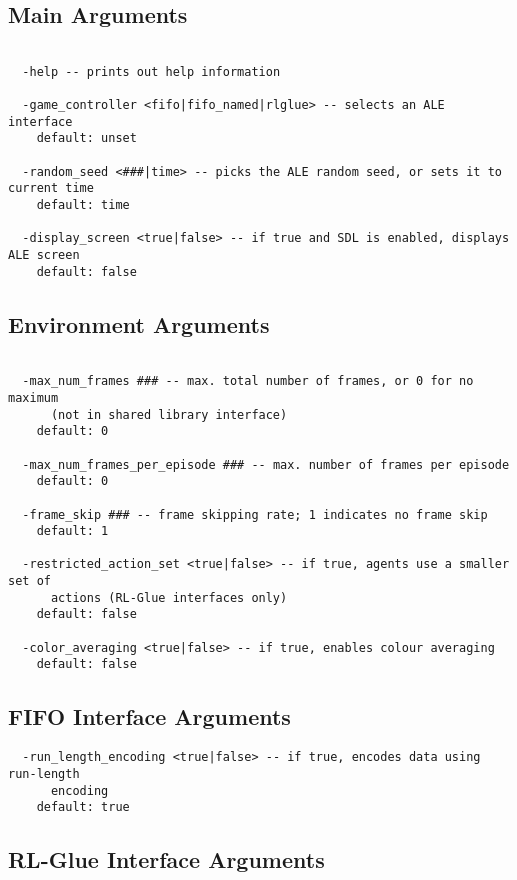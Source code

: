 \documentclass[12pt]{article}
\begin{document}
\subsection{Main Arguments}
\small{
\begin{verbatim}

  -help -- prints out help information

  -game_controller <fifo|fifo_named|rlglue> -- selects an ALE interface
    default: unset

  -random_seed <###|time> -- picks the ALE random seed, or sets it to current time
    default: time

  -display_screen <true|false> -- if true and SDL is enabled, displays ALE screen
    default: false

\end{verbatim}
}

\subsection{Environment Arguments}

\small{
\begin{verbatim}

  -max_num_frames ### -- max. total number of frames, or 0 for no maximum 
      (not in shared library interface)
    default: 0

  -max_num_frames_per_episode ### -- max. number of frames per episode
    default: 0

  -frame_skip ### -- frame skipping rate; 1 indicates no frame skip 
    default: 1

  -restricted_action_set <true|false> -- if true, agents use a smaller set of 
      actions (RL-Glue interfaces only)
    default: false

  -color_averaging <true|false> -- if true, enables colour averaging 
    default: false

\end{verbatim}
}

\subsection{FIFO Interface Arguments}

\small{
\begin{verbatim}
  -run_length_encoding <true|false> -- if true, encodes data using run-length
      encoding
    default: true
\end{verbatim}
}

\subsection{RL-Glue Interface Arguments}
\end{document}
